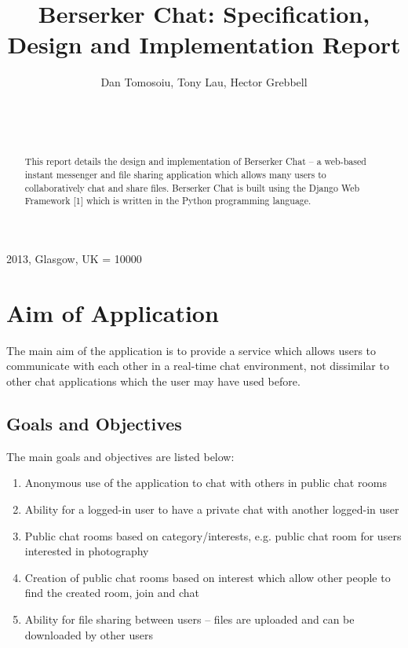 \documentclass{sig-alt-release2}
\begin{document}
\newcommand{\todo}[1]{\textcolor{red}{#1}}
\def\newblock{\hskip .11em plus .33em minus .07em}

 {2013, Glasgow, UK} 
\widowpenalty = 10000

\title{{Berserker Chat: Specification, Design and Implementation Report}}

\author{
\alignauthor Dan Tomosoiu, Tony Lau, Hector Grebbell\\
\\
\\
\\
}
\maketitle

\begin{abstract}
This report details the design and implementation of Berserker Chat --
a web-based instant messenger and file sharing application which allows many users to
collaboratively chat and share files. Berserker Chat is built using the Django Web Framework [1]
which is written in the Python programming language.

\end{abstract}

\section{Aim of Application}
The main aim of the application is to provide a service which allows users to communicate with each other in a real-time
chat environment, not dissimilar to other chat applications which the user may have used before.

\subsection{Goals and Objectives}
\label{sec: goals}
The main goals and objectives are listed below:
\begin{enumerate}
\item Anonymous use of the application to chat with others in public chat rooms
\item Ability for a logged-in user to have a private chat with another logged-in user
\item Public chat rooms based on category/interests, e.g. public chat room for users interested in photography
\item Creation of public chat rooms based on interest which allow other people to find the created room, join and chat
\item Ability for file sharing between users -- files are uploaded and can be downloaded by other users 
\end{enumerate}
\end{document}
